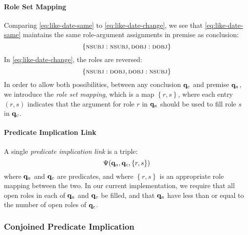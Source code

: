 \documentclass[11pt]{article}
\newcommand{\qvariable}{{\bf q}}
\begin{document}
\paragraph{Role Set Mapping}
Comparing \ref{eq:like-date-same} to \ref{eq:like-date-change}, we see that \ref{eq:like-date-same} maintains the same role-argument assignments in premise as conclusion:
\begin{equation}
    \left\{\textsc{nsubj} : \textsc{nsubj}, \textsc{dobj} : \textsc{dobj} \right\}
\end{equation}
In \ref{eq:like-date-change}, the roles are reversed:
\begin{equation}
    \left\{\textsc{nsubj} : \textsc{dobj}, \textsc{dobj} : \textsc{nsubj} \right\}
\end{equation}
In order to allow both possibilities, between any conclusion $\qvariable_c$ and premise $\qvariable_a$, we introduce the {\em role set mapping}, which is a map $\left\{r,  s\right\}$, where each entry $(r, s)$ indicates that the argument for role $r$ in $\qvariable_a$ should be used to fill role $s$ in $\qvariable_c$.

\paragraph{Predicate Implication Link}
A single {\em predicate implication link} is a triple:
\begin{equation}
    \Psi(\qvariable_a, \qvariable_c, \left\{r, s\right\})
\end{equation}
where $\qvariable_a$ and $\qvariable_c$ are predicates, and where $\left\{r, s\right\}$ is an appropriate role mapping between the two.
In our current implementation, we require that all open roles in each of $\qvariable_a$ and $\qvariable_c$ be filled, and that $\qvariable_a$ have less than or equal to the number of open roles of $\qvariable_c$.

\subsubsection{Conjoined Predicate Implication}
\end{document}
